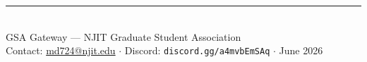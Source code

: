 \documentclass[12pt,letterpaper]{article}
\begin{document}
\vspace{2em}
\begin{center}
\rule{0.5\textwidth}{0.4pt}\\[0.5em]
{\small GSA Gateway — NJIT Graduate Student Association\\
Contact: \href{mailto:md724@njit.edu}{md724@njit.edu} $\cdot$
Discord: \texttt{discord.gg/a4mvbEmSAq} $\cdot$
June 2026}
\end{center}
\end{document}
